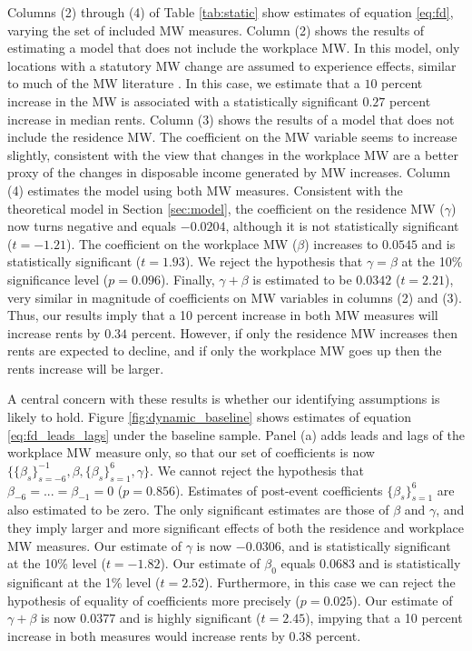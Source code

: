 Columns (2) through (4) of Table \ref{tab:static} show estimates of equation 
\eqref{eq:fd}, varying the set of included MW measures.
Column (2) shows the results of estimating a model that does not include the 
workplace MW.
In this model, only locations with a statutory MW change are assumed to 
experience effects, similar to much of the MW literature 
\parencite[e.g.,][]{DubeEtAl2010, MeerWest2016, Yamagishi2021}.
In this case, we estimate that a $10$ percent increase in the MW is associated 
with a statistically significant $0.27$ percent increase in median rents.
Column (3) shows the results of a model that does not include the residence MW.
The coefficient on the MW variable seems to increase slightly, consistent with 
the view that changes in the workplace MW are a better proxy of the changes in 
disposable income generated by MW increases.
Column (4) estimates the model using both MW measures.
Consistent with the theoretical model in Section \ref{sec:model}, the 
coefficient on the residence MW ($\gamma$) now turns negative and equals 
$-0.0204$, although it is not statistically significant ($t=-1.21$).
The coefficient on the workplace MW ($\beta$) increases to $0.0545$ and is 
statistically significant ($t=1.93$).
We reject the hypothesis that $\gamma=\beta$ at the 10\% significance level 
($p = 0.096$).
Finally, $\gamma+\beta$ is estimated to be $0.0342$ ($t=2.21$), very similar in
magnitude of coefficients on MW variables in columns (2) and (3).
Thus, our results imply that a 10 percent increase in both MW measures will 
increase rents by $0.34$ percent.
However, if only the residence MW increases then rents are expected to decline,
and if only the workplace MW goes up then the rents increase will be larger.

A central concern with these results is whether our identifying assumptions is 
likely to hold.
Figure \ref{fig:dynamic_baseline} shows estimates of equation 
\eqref{eq:fd_leads_lags} under the baseline sample.
Panel (a) adds leads and lags of the workplace MW measure only, so that
our set of coefficients is now 
$\{\{\beta_s\}_{s=-6}^{-1},\beta,\{\beta_s\}_{s=1}^6,\gamma\}$.
We cannot reject the hypothesis that $\beta_{-6}=...=\beta_{-1}=0$ 
($p = 0.856$).
Estimates of post-event coefficients $\{\beta_s\}_{s=1}^6$ are also estimated to 
be zero.
The only significant estimates are those of $\beta$ and $\gamma$, and they 
imply larger and more significant effects of both the residence and workplace MW
measures.
Our estimate of $\gamma$ is now $-0.0306$, and is statistically significant 
at the 10\% level ($t=-1.82$).
Our estimate of $\beta_0$ equals $0.0683$ and is statistically 
significant at the 1\% level ($t=2.52$).
Furthermore, in this case we can reject the hypothesis of equality of coefficients more
precisely ($p = 0.025$).
Our estimate of $\gamma+\beta$ is now $0.0377$ and is highly significant 
($t=2.45$), impying that a 10 percent increase in both measures would increase
rents by $0.38$ percent.


